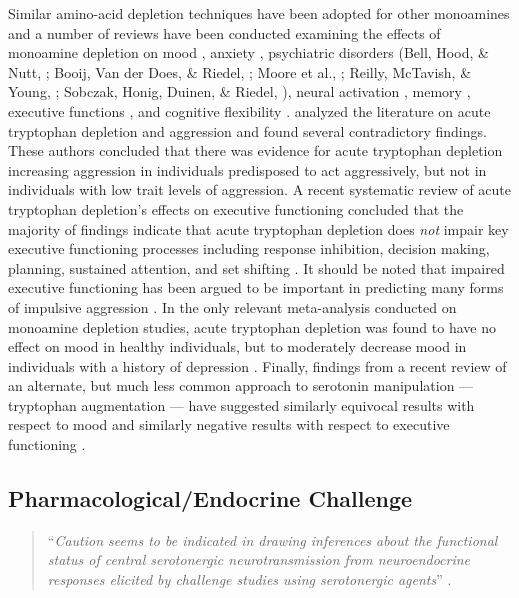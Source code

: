 Similar amino-acid depletion techniques have been adopted for other monoamines and a number of reviews have been conducted examining the effects of monoamine depletion on mood \parencite{Ruhe2007, Vanderdoes2001}, anxiety \parencite{Anderson1999}, psychiatric disorders (Bell, Hood, \& Nutt, \citeyear{Bell2005}; Booij, Van der Does, \& Riedel, \citeyear{Booij03}; Moore et al., \citeyear{Moore2002}; Reilly, McTavish, \& Young, \citeyear{Reilly1997}; Sobczak, Honig, Duinen, \& Riedel, \citeyear{Sobczak2002}), neural activation \parencite{Fusar2006}, memory \parencite{Sambeth2007}, executive functions \parencite{Mendelsohn2009}, and cognitive flexibility \parencite{Evers2007}. \citeauthor{Booij03} analyzed the literature on acute tryptophan depletion and  aggression and found several contradictory findings. These authors concluded that there was evidence for acute tryptophan depletion increasing aggression in individuals predisposed to act aggressively, but not in individuals with low trait levels of aggression. A recent systematic review of acute tryptophan depletion's effects on executive functioning concluded that the majority of findings indicate that acute tryptophan depletion does \emph{not} impair key executive functioning processes including response inhibition, decision making, planning, sustained attention, and set shifting \parencite{Mendelsohn2009}. It should be noted that impaired executive functioning has been argued to be important in predicting many forms of impulsive aggression \parencite[e.g.,][]{Hancock2010}. In the only relevant meta-analysis conducted on monoamine depletion studies, acute tryptophan depletion was found to have no effect on mood in healthy individuals, but to moderately decrease mood in individuals with a history of depression \parencite{Ruhe2007}. Finally, findings from a recent review of an alternate, but much less common approach to serotonin manipulation --- tryptophan augmentation --- have suggested similarly equivocal results with respect to mood and similarly negative results with respect to executive functioning \parencite{Silber2010}.



\subsection{Pharmacological\slash Endocrine Challenge}
\begin{quotation}\noindent ``\emph{Caution seems to be indicated in drawing inferences about the functional status of central serotonergic neurotransmission from neuroendocrine responses elicited by challenge studies using serotonergic agents}'' \parencite[][213]{Murphy1996}.\end{quotation}


